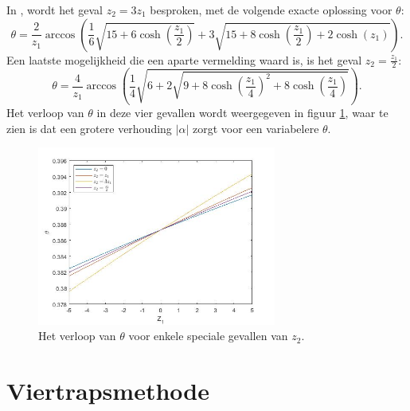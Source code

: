 \documentclass[12pt]{article}
\begin{document}
In \cite{6thordersympl2}, wordt het geval \(z_2=3z_1\) besproken, met de volgende exacte oplossing voor \(\theta\): 
\begin{equation} \label{eq:rks3z2=3z1}
    \theta=\frac{2}{z_1}\arccos\left(\frac{1}{6}\sqrt{15+6\cosh\left(\frac{z_1}{2}\right)}+3\sqrt{15+8\cosh\left(\frac{z_1}{2}\right)+2\cosh(z_1)}\right).
\end{equation}
Een laatste mogelijkheid die een aparte vermelding waard is, is het geval \(z_2=\frac{z_1}{2}\):
\begin{equation} \label{eq:rks3z2=z1/2}
    \theta=\frac{4}{z_1}\arccos\left(\frac{1}{4}\sqrt{6+2\sqrt{9+8\cosh\left(\frac{z_1}{4}\right)^2+8\cosh\left(\frac{z_1}{4}\right)}}\right).
\end{equation}
Het verloop van \(\theta\) in deze vier gevallen wordt weergegeven in figuur \ref{fig:rks3specials}, waar te zien is dat een grotere verhouding \(|\alpha|\) zorgt voor een variabelere \(\theta\).
\begin{figure}[H]
    \centering
    \includegraphics[width=0.7\textwidth]{specials_RKs3.jpg}
    \caption{Het verloop van \(\theta\) voor enkele speciale gevallen van \(z_2\).}
    \label{fig:rks3specials}
\end{figure}

\newpage
\section{Viertrapsmethode} \label{sec:rks4}
\end{document}
